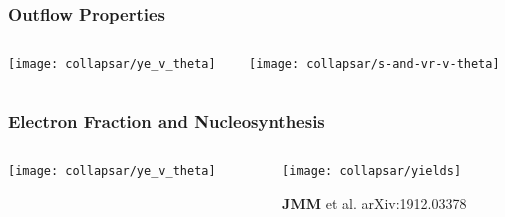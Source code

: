 \documentclass[]{beamer}
\begin{document}
\begin{frame}
  \frametitle{Outflow Properties}
  \begin{columns}
    \begin{column}{5cm}
      \begin{center}
        \texttt{[image: collapsar/ye\_v\_theta]}
      \end{center}
    \end{column}
    \begin{column}{7cm}
      \begin{center}
        \texttt{[image: collapsar/s-and-vr-v-theta]}
      \end{center}
    \end{column}
  \end{columns}
\end{frame}

\begin{frame}
  \frametitle{Electron Fraction and Nucleosynthesis}
  \begin{columns}
    \begin{column}{5cm}
      \begin{center}
        \texttt{[image: collapsar/ye\_v\_theta]}
      \end{center}
    \end{column}
    \begin{column}{7cm}
      \begin{center}
        \texttt{[image: collapsar/yields]}
      \end{center}
      \begin{tiny}
        \textbf{JMM} et al. arXiv:1912.03378
      \end{tiny}
    \end{column}
  \end{columns}
\end{frame}
\end{document}
